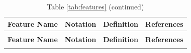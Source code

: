 \documentclass[10pt,a4paper,oneside]{article}
\begin{document}


\begin{longtable}{|p{4cm}|p{2.25cm}|p{5.25cm}|p{2.25cm}|}
    \hline
    \textbf{Feature Name}                                                                                                                                                  & \textbf{Notation}     & \textbf{Definition}                                                                                                                                                 & \textbf{References} \\ \hline
    \endfirsthead
    \caption*{Table \ref{tab:features} (continued)}                                                                                                                                                                                                                                                                                                                                            \\
    \hline
    \textbf{Feature Name}                                                                                                                                                  & \textbf{Notation}     & \textbf{Definition}                                                                                                                                                 & \textbf{References} \\ \hline
    \endhead
    \hline
    \endfoot
    \hline
    \endlastfoot



\end{longtable}
\end{document}
